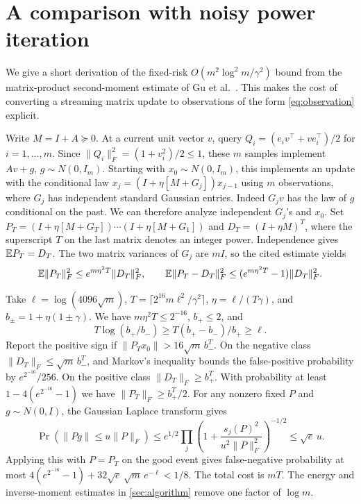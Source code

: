 \section{A comparison with noisy power iteration}\label{sec:oja}

We give a short derivation of the fixed-risk \(O(m^2\log^2 m/\gamma^2)\) bound from the matrix-product second-moment estimate of Gu et al.~\cite[Lemma~3]{gu2026}. This makes the cost of converting a streaming matrix update to observations of the form \eqref{eq:observation} explicit.

Write \(M=I+A\succeq0\). At a current unit vector \(v\), query \(Q_i=(e_iv^\top+ve_i^\top)/2\) for \(i=1,\dots,m\). Since \(\|Q_i\|_F^2=(1+v_i^2)/2\le1\), these \(m\) samples implement \(Av+g\), \(g\sim N(0,I_m)\). Starting with \(x_0\sim N(0,I_m)\), this implements an update with the conditional law \(x_j=(I+\eta[M+G_j])x_{j-1}\) using \(m\) observations, where \(G_j\) has independent standard Gaussian entries. Indeed \(G_j v\) has the law of \(g\) conditional on the past. We can therefore analyze independent \(G_j\)'s and \(x_0\). Set \(P_T=(I+\eta[M+G_T])\cdots(I+\eta[M+G_1])\) and \(D_T=(I+\eta M)^T\), where the superscript \(T\) on the last matrix denotes an integer power. Independence gives \(\mathbb E P_T=D_T\). The two matrix variances of \(G_j\) are \(mI\), so the cited estimate yields
\[
 \mathbb E\|P_T\|_F^2\le e^{m\eta^2T}\|D_T\|_F^2,\qquad
 \mathbb E\|P_T-D_T\|_F^2\le(e^{m\eta^2T}-1)\|D_T\|_F^2.
\]

Take \(\ell=\log(4096\sqrt m)\), \(T=\lceil 2^{16}m\ell^2/\gamma^2\rceil\), \(\eta=\ell/(T\gamma)\), and \(b_\pm=1+\eta(1\pm\gamma)\). We have \(m\eta^2T\le2^{-16}\), \(b_+\le2\), and
\[
 T\log(b_+/b_-)\ge T(b_+-b_-)/b_+\ge \ell .
\]
Report the positive sign if \(\|P_Tx_0\|>16\sqrt m\, b_-^T\). On the negative class \(\|D_T\|_F\le\sqrt m\,b_-^T\), and Markov's inequality bounds the false-positive probability by \(e^{2^{-16}}/256\). On the positive class \(\|D_T\|_F\ge b_+^T\). With probability at least \(1-4(e^{2^{-16}}-1)\) we have \(\|P_T\|_F\ge b_+^T/2\). For any nonzero fixed \(P\) and \(g\sim N(0,I)\), the Gaussian Laplace transform gives
\[
 \Pr(\|Pg\|\le u\|P\|_F)
 \le e^{1/2}\prod_j\left(1+\frac{s_j(P)^2}{u^2\|P\|_F^2}\right)^{-1/2}
 \le \sqrt e\,u .
\]
Applying this with \(P=P_T\) on the good event gives false-negative probability at most \(4(e^{2^{-16}}-1)+32\sqrt e\,\sqrt m\,e^{-\ell}<1/8\). The total cost is \(mT\). The energy and inverse-moment estimates in \cref{sec:algorithm} remove one factor of \(\log m\).
